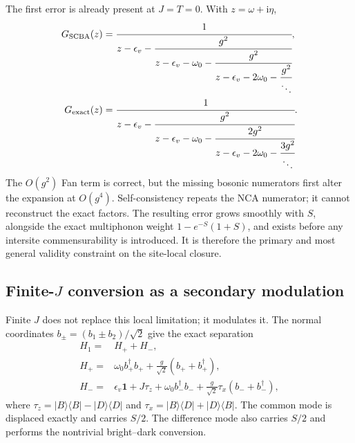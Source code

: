 \documentclass[11pt]{article}
\newcommand{\ii}{\mathrm{i}}
\newcommand{\ket}[1]{\lvert #1\rangle}
\newcommand{\bra}[1]{\langle #1\rvert}
\newcommand{\SCBA}{\mathrm{SCBA}}
\begin{document}
The first error is already present at $J=T=0$.  With
$z=\omega+\ii\eta$,
\begin{align}
G_{\SCBA}(z)&=
\cfrac{1}{z-\epsilon_v-
 \cfrac{g^2}{z-\epsilon_v-\omega_0-
  \cfrac{g^2}{z-\epsilon_v-2\omega_0-
   \cfrac{g^2}{\ddots}}}},\label{eq:scbacf}\\
G_{\rm exact}(z)&=
\cfrac{1}{z-\epsilon_v-
 \cfrac{g^2}{z-\epsilon_v-\omega_0-
  \cfrac{2g^2}{z-\epsilon_v-2\omega_0-
   \cfrac{3g^2}{\ddots}}}}.
\label{eq:exactcf}
\end{align}
The $O(g^2)$ Fan term is correct, but the missing bosonic numerators first
alter the expansion at $O(g^4)$.  Self-consistency repeats the NCA numerator;
it cannot reconstruct the exact factors.  The resulting error grows smoothly
with $S$, alongside the exact multiphonon weight
$1-e^{-S}(1+S)$, and exists before any intersite commensurability is
introduced.  It is therefore the primary and most general validity constraint
on the site-local closure.

\subsection{\texorpdfstring{Finite-$J$}{Finite-J} conversion as a secondary modulation}

Finite $J$ does not replace this local limitation; it modulates it.  The normal
coordinates $b_\pm=(b_1\pm b_2)/\sqrt2$ give the exact separation
\begin{align}
H_1={}&H_++H_-,\\
H_+={}&\omega_0 b_+^\dagger b_+
 +\frac{g}{\sqrt2}(b_++b_+^\dagger),\\
H_-={}&\epsilon_v\bm1+J\tau_z+\omega_0 b_-^\dagger b_-
 +\frac{g}{\sqrt2}\tau_x(b_-+b_-^\dagger),
\label{eq:hminus}
\end{align}
where $\tau_z=\ket B\bra B-\ket D\bra D$ and
$\tau_x=\ket B\bra D+\ket D\bra B$.  The common mode is displaced exactly
and carries $S/2$.  The difference mode also carries $S/2$ and performs the
nontrivial bright--dark conversion.
\end{document}
